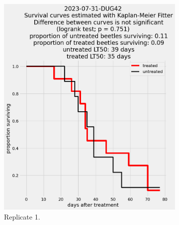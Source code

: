 \documentclass[12pt,letterpaper,english,bibliography=totocnumbered, abstract=on]{scrartcl}
\begin{document}

\begin{figure}[h]
	\centering
	\begin{subfigure}{.3\textwidth}
		\includegraphics[width=\linewidth]{images/survival_curves/2023-07-31-DUG42}
		\caption{Replicate 1.}
	\end{subfigure}
	\begin{subfigure}{.3\textwidth}

\end{subfigure}
\end{figure}
\end{document}
